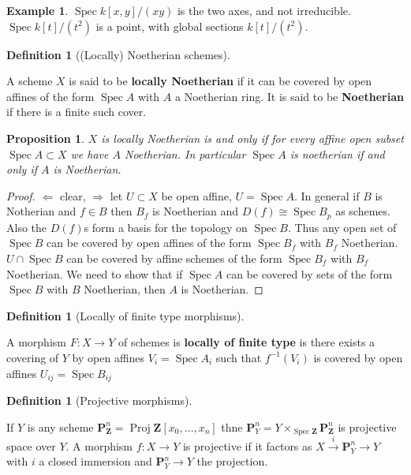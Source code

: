 \documentclass[10pt,]{book}
\newcommand{\terminology}[1]{\textbf{#1}}
\theoremstyle{plain}
\newtheorem{proposition}[theorem]{Proposition}
\theoremstyle{definition}
\newtheorem{definition}[theorem]{Definition}
\newtheorem{example}[theorem]{Example}
\numberwithin{equation}{section}
\newcommand{\PP}{\mathbf{P}}
\newcommand{\ZZ}{\mathbf{Z}}
\DeclareMathOperator{\Spec}{Spec}
\DeclareMathOperator{\Proj}{Proj}
\begin{document}
\begin{example}\label{example-3}
\(\Spec k[x,y]/(xy)\) is the two axes, and not irreducible.\newline{}\(\Spec k[t]/(t^2)\) is a point, with global sections \(k[t]/(t^2)\).\newline{}\end{example}
\begin{definition}[(Locally) Noetherian schemes]\label{definition-9}

            A scheme \(X\) is said to be \terminology{locally Noetherian} if it can be covered by open affines of the form \(\Spec A\) with \(A\) a Noetherian ring.
            It is said to be \terminology{Noetherian} if there is a finite such cover.
          \end{definition}
\begin{proposition}\label{proposition-4}
\(X\) is locally Noetherian is and only if for every affine open subset \(\Spec A \subset X\) we have \(A\) Noetherian.
            In particular \(\Spec A\) is noetherian if and only if \(A\) is Noetherian.
          \end{proposition}
\begin{proof}
\(\Leftarrow\) clear, \(\Rightarrow\) let \(U \subset X\) be open affine, \(U = \Spec A\).
            In general if \(B\) is Notherian and \(f \in B\) then \(B_f\) is Noetherian and \(D(f) \cong \Spec B_p\) as schemes.
            Also the \(D(f)\)s form a basis for the topology on \(\Spec B\).
            Thus any open set of \(\Spec B\) can be covered by open affines of the form \(\Spec B_f \) with \(B_f\) Noetherian.
            \(U \cap \Spec B\) can be covered by affine schemes of the form \(\Spec B_f\) with \(B_f \) Noetherian.
            We need to show that if \(\Spec A\) can be covered by sets of the form \(\Spec B\) with \(B\) Noetherian, then \(A\) is Noetherian.
          \end{proof}
\begin{definition}[Locally of finite type morphisms]\label{definition-10}

            A morphism \(F\colon X \to Y\) of schemes is \terminology{locally of finite type} is there exists a covering of \(Y\) by open affines \(V_i = \Spec A_i\) such that \(f^{-1}(V_i)\) is covered by open affines \(U_{ij} = \Spec B_{ij}\)\end{definition}
\begin{definition}[Projective morphisms]\label{definition-11}

            If \(Y\) is any scheme \(\PP_{\ZZ}^n = \Proj \ZZ[x_0,\ldots,x_n]\) thne \(\PP_Y^n = Y \times_{\Spec \ZZ}\PP_{\ZZ}^n\) is projective space over \(Y\).
            A morphism \(f\colon X \to Y \) is projective if it factors as \(X \xrightarrow{i} \PP_Y^n \to Y\) with \(i\) a closed immersion and \(\PP_Y^n \to Y\) the projection.
          \end{definition}
%
\backmatter
%
\end{document}
